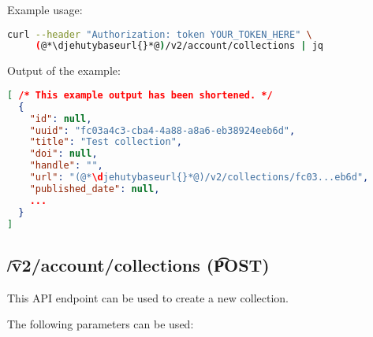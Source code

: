   Example usage:
\begin{lstlisting}[language=bash]
curl --header "Authorization: token YOUR_TOKEN_HERE" \
     (@*\djehutybaseurl{}*@)/v2/account/collections | jq
\end{lstlisting}

  Output of the example:
\begin{lstlisting}[language=JSON]
[ /* This example output has been shortened. */
  {
    "id": null,
    "uuid": "fc03a4c3-cba4-4a88-a8a6-eb38924eeb6d",
    "title": "Test collection",
    "doi": null,
    "handle": "",
    "url": "(@*\djehutybaseurl{}*@)/v2/collections/fc03...eb6d",
    "published_date": null,
    ...
  }
]
\end{lstlisting}

\subsection{\t{/v2/account/collections} (\t{POST})}

  This API endpoint can be used to create a new collection.

  The following parameters can be used:

